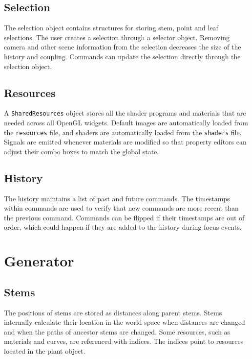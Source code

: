 \documentclass[10pt]{article}
\begin{document}
\subsection{Selection}

The selection object contains structures for storing stem, point and leaf selections. The user creates a selection through a selector object. Removing camera and other scene information from the selection decreases the size of the history and coupling. Commands can update the selection directly through the selection object.

\subsection{Resources}

A \texttt{SharedResources} object stores all the shader programs and materials that are needed across all OpenGL widgets. Default images are automatically loaded from the \texttt{resources} file, and shaders are automatically loaded from the \texttt{shaders} file. Signals are emitted whenever materials are modified so that property editors can adjust their combo boxes to match the global state.

\subsection{History}

The history maintains a list of past and future commands. The timestamps within commands are used to verify that new commands are more recent than the previous command. Commands can be flipped if their timestamps are out of order, which could happen if they are added to the history during focus events.

\section{Generator}

\subsection{Stems}

The positions of stems are stored as distances along parent stems. Stems internally calculate their location in the world space when distances are changed and when the paths of ancestor stems are changed. Some resources, such as materials and curves, are referenced with indices. The indices point to resources located in the plant object.
\end{document}
